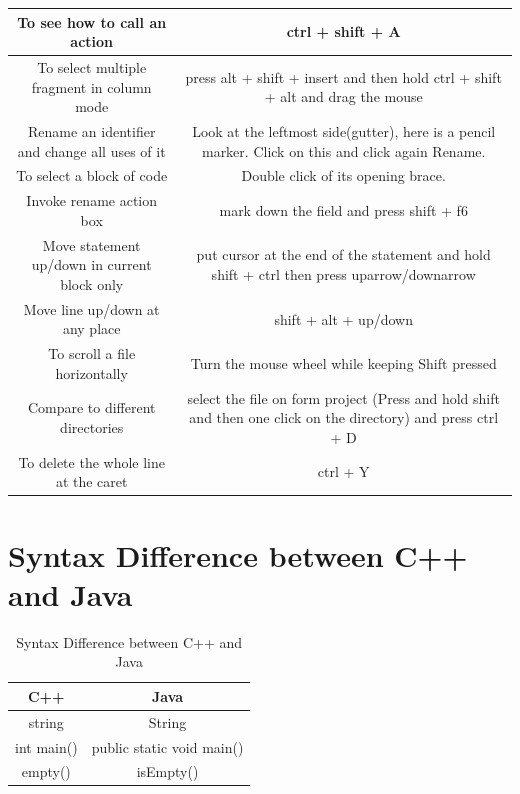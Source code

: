 \documentclass[11 pt]{book}
\begin{document}
\begin{tabular}{| c | c |}
		\hline
		To see how to call an action & ctrl + shift + A\\
		\hline
		To select multiple fragment in column mode & press alt + shift + insert and then hold ctrl + shift + alt and drag the mouse\\
		\hline
		Rename an identifier and change all uses of it & Look at the leftmost side(gutter), here is a pencil marker. Click on this and click again Rename.\\
		\hline
		To select a block of code & Double click of its opening brace.\\
		\hline
		Invoke rename action box & mark down the field and press shift + f6\\
		\hline
		Move statement up/down in current block only & put cursor at the end of the statement and hold shift + ctrl then press uparrow/downarrow\\
		\hline
		Move line up/down at any place & shift + alt 
		+ 
		up/down\\
		\hline
		To scroll a file horizontally & Turn the mouse wheel while keeping Shift pressed\\
		\hline
		Compare to different directories & select the file on form project (Press and hold shift and then one click on the directory) and press ctrl + D\\
		\hline
		To delete the whole line at the caret & ctrl + Y\\
		\hline
		
	\end{tabular}

\section{Syntax Difference between C++ and Java}
\setlength{\arrayrulewidth}{0.3 mm}
\setlength{\tabcolsep}{18pt}
\renewcommand{\arraystretch}{1.5}
\begin{center}
	\begin{table}
		\centering
		\begin{tabular}{| c | c |}
		\hline
		C++ & Java\\
		\hline
		string & String\\
		\hline
		int main() & public static void main()\\
		\hline
		empty() & isEmpty()\\
		\hline
		\end{tabular}
		\caption{Syntax Difference between C++ and Java}
	\end{table}
\end{center}
\end{document}
